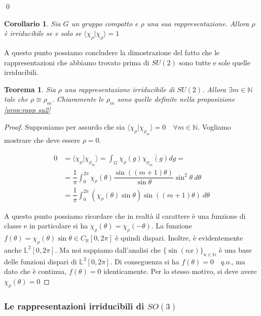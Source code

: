 \documentclass[11pt]{article}
\theoremstyle{plain}
\newtheorem{thm}{Teorema}[section]
\newtheorem*{cor}{Corollario}
\theoremstyle{definition}
\theoremstyle{remark}
\newcommand{\R}{\mathbb{R}}
\newcommand{\N}{\mathbb{N}}
\newcommand{\dint}{\displaystyle\int}
\begin{document}
 \qed

 \begin{cor}
   Sia $G$ un gruppo compatto e $\rho$ una sua rappresentazione. Allora $\rho$ è irriducibile se e solo se $\langle \chi_\rho | \chi_\rho \rangle = 1$
 \end{cor}

 
 A questo punto possiamo concludere la dimostrazione del fatto che le rappresentazioni che abbiamo trovato prima di $SU(2)$ sono tutte e sole quelle irriducibili.

 
 \begin{thm}
   Sia $\rho$ una rappresentazione irriducibile di $SU(2)$. Allora $\exists m \in \N$ tale che $\rho \cong \rho_m$. Chiaramente le $\rho_m$ sono quelle definite nella proposizione \ref{prop:rapp su2}
 \end{thm}

 \begin{proof}
   Supponiamo per assurdo che sia $\langle \chi_\rho | \chi_{\rho_m} \rangle = 0 \quad \forall m \in \N$. Vogliamo mostrare che deve essere $\rho = 0$. 


   \begin{align*}
     0 &= \langle \chi_\rho | \chi_{\rho_m} \rangle = \dint_G \chi_\rho(g) \overline{\chi_{\rho_m} (g)} dg = \\
     &= \dfrac{1}{\pi} \dint_0^{2\pi} \chi_\rho(\theta) \dfrac{\sin((m+1)\theta)}{\sin\theta} \sin^2\theta  \ d\theta \\
     &= \dfrac{1}{\pi} \dint_{0}^{2\pi} \left(\chi_\rho (\theta) \sin\theta \right) \sin(  (m+1) \theta) \ d\theta
   \end{align*}

   A questo punto possiamo ricordare che in realtà il carattere è una funzione di classe e in particolare si ha $\chi_\rho(\theta) = \chi_\rho(-\theta)$. La funzione $f(\theta) = \chi_\rho(\theta) \sin\theta \in C_\R[0,2\pi]$ è quindi dispari. Inoltre, è evidentemente anche $\mathbb{L}^2 [0,2\pi]$. Ma noi sappiamo dall'analisi che $\{\sin(nx)\}_{n\in \N}$ è una base delle funzioni dispari di $\mathbb{L}^2[0,2\pi]$. Di conseguenza si ha $f(\theta) = 0 \quad q.o.$, ma dato che è continua, $f(\theta) = 0$ identicamente. Per lo stesso motivo, si deve avere $\chi_\rho(\theta) = 0$
   
 \end{proof}


 \newpage
 \subsubsection{Le rappresentazioni irriducibili di $SO(3)$}
\end{document}
